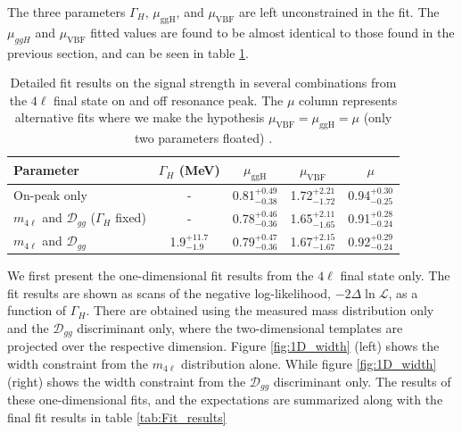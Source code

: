 The three parameters $\Gamma_{H}$, $\mu_{\text{ggH}}$, and $\mu_\mathrm{VBF}$ are left unconstrained in the fit. The $\mu_{ggH}$ and $\mu_\mathrm{VBF}$ fitted values are found to be almost identical to those found in the previous section, and can be seen in table \ref{tab:fitresults}. 

\begin{table}[htb]
\begin{center}
\begin{tabular}{l|ccc|c}
\hline
Parameter & $\Gamma_H$ (MeV) & $\mu_{\mathrm{ggH}}$ & $\mu_{\mathrm{VBF}}$ & $\mu$\\
\hline
On-peak only & - & 0.81$_{-0.38}^{+0.49}$ & 1.72$_{-1.72}^{+2.21}$ & 0.94$_{-0.25}^{+0.30}$ \\
\hline
$m_{4\ell}$ and $\mathcal{D}_{gg}$ ($\Gamma_H$ fixed) & - & 0.78$_{-0.36}^{+0.46}$ & 1.65$_{-1.65}^{+2.11}$ & 0.91$_{-0.24}^{+0.28}$ \\
$m_{4\ell}$ and $\mathcal{D}_{gg}$ & 1.9$_{-1.9}^{+11.7}$ & 0.79$_{-0.36}^{+0.47}$ & 1.67$_{-1.67}^{+2.15}$ & 0.92$_{-0.24}^{+0.29}$ \\
\hline
\end{tabular}
\caption[Detailed fit results on the signal strength in several combinations from the $4\ell$ final state on and off resonance peak. The $\mu$ column represents alternative fits where we make the hypothesis $\mu_\text{VBF} = \mu_\text{ggH} = \mu$ (only two parameters floated).]{Detailed fit results on the signal strength in several combinations from the $4\ell$ final state on and off resonance peak. The $\mu$ column represents alternative fits where we make the hypothesis $\mu_\text{VBF} = \mu_\text{ggH} = \mu$ (only two parameters floated) \cite{CMS_AN_2014_018}.} 
\label{tab:fitresults}
\end{center}
\end{table}

We first present the one-dimensional fit results from the $4\ell$ final state only. The fit results are shown as scans of the negative
log-likelihood, $-2 \Delta \ln\mathcal{L}$, as a function of $\Gamma_{H}$. There are obtained using the measured mass distribution only and the $\mathcal{D}_{gg}$ discriminant only, where the two-dimensional templates are projected over the respective dimension. Figure \ref{fig:1D_width} (left) shows the width constraint from the $m_{4\ell}$ distribution alone. While figure \ref{fig:1D_width} (right) shows the width constraint from the $\mathcal{D}_{gg}$ discriminant only. The results of these one-dimensional fits, and the expectations are summarized along with the final fit results in table \ref{tab:Fit_results}


